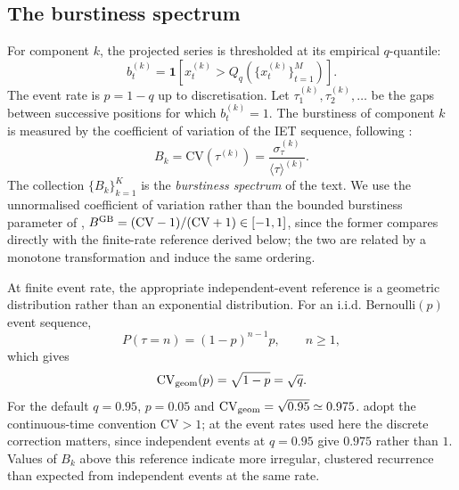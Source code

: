 \documentclass[12pt,a4paper]{article}
\newcommand{\bk}{B_k}
\newcommand{\xtk}{x_t^{(k)}}
\newcommand{\meantau}{\langle\tau\rangle}
\newcommand{\sigmatau}{\sigma_\tau}
\newcommand{\CV}{\mathrm{CV}}
\begin{document}
\subsection{The burstiness spectrum}
\label{sec:burstiness_spectrum}



For component $k$, the projected series is thresholded at its empirical
$q$-quantile:
\begin{equation}
  b_t^{(k)}=
  \mathbf{1}\!\left[
  \xtk>Q_q\!\left(\{\xtk\}_{t=1}^M\right)
  \right].
  \label{eq:binary_k}
\end{equation}
The event rate is $p=1-q$ up to discretisation.
Let $\tau_1^{(k)},\tau_2^{(k)},\ldots$ be the gaps between successive
positions for which $b_t^{(k)}=1$.
The burstiness of component $k$ is measured by the coefficient of
variation of the IET sequence, following \citet{Altmann2012}:
\begin{equation}
  \bk
  =\CV\!\left(\tau^{(k)}\right)
  =\frac{\sigmatau^{(k)}}{\meantau^{(k)}}.
  \label{eq:burstiness_def}
\end{equation}
The collection $\{\bk\}_{k=1}^K$ is the \emph{burstiness spectrum} of
the text.
We use the unnormalised coefficient of variation rather than the
bounded burstiness parameter of \citet{GohBarabasi2008},
$B^{\rm GB}=(\CV-1)/(\CV+1)\in[-1,1]$, since the former compares
directly with the finite-rate reference derived below; the two are
related by a monotone transformation and induce the same ordering.

At finite event rate, the appropriate independent-event reference is a
geometric distribution rather than an exponential distribution.
For an i.i.d. Bernoulli$(p)$ event sequence,
\begin{equation}
  P(\tau=n)=(1-p)^{n-1}p,
  \qquad n\geq1,
\end{equation}
which gives
\begin{equation}
   \CV_{\rm geom}(p)=\sqrt{1-p}=\sqrt{q}.
  \label{eq:cv_geometric}
\end{equation}
For the default $q=0.95$, $p=0.05$ and
$\CV_{\rm geom}=\sqrt{0.95}\simeq0.975$.
\citet{Altmann2012} adopt the continuous-time convention $\CV>1$; at
the event rates used here the discrete correction matters, since
independent events at $q=0.95$ give $0.975$ rather than $1$.
Values of $B_k$ above this reference indicate more irregular,
clustered recurrence than expected from independent events at the same
rate.

\end{document}
